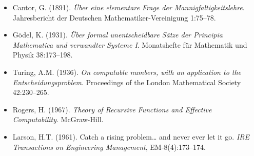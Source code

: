 \documentclass[12pt,a4paper]{article}
\makeatletter
\renewcommand{\_}{\ig@origunderscore\discretionary{}{}{}}
\makeatother
\begin{document}
\begin{itemize}
 \item Cantor, G. (1891). \emph{\"Uber eine elementare Frage der Mannigfaltigkeitslehre}. Jahresbericht der
Deutschen Mathematiker-Vereinigung 1:75--78.
 \item G\"odel, K. (1931). \emph{\"Uber formal unentscheidbare S\"atze der Principia Mathematica und verwandter Systeme I}. Monatshefte f\"ur Mathematik und Physik 38:173--198.
 \item Turing, A.M. (1936). \emph{On computable numbers, with an application to the Entscheidungsproblem}.
Proceedings of the London Mathematical Society 42:230--265.
 \item Rogers, H. (1967). \emph{Theory of Recursive Functions and Effective Computability}. McGraw-Hill.
 \item Larson, H.T. (1961). Catch a rising problem\ldots{} and never ever let it go. \emph{IRE Transactions on Engineering Management}, EM-8(4):173--174.
\end{itemize}
\end{document}
